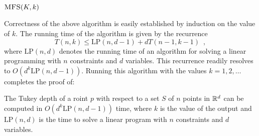 \documentclass[charterfonts,lotsofwhite]{patmorin}
\newcommand{\lp}{\mathrm{LP}}
\begin{document}
\noindent$\textsc{MFS}(K,k)$
\begin{algorithmic}[1]
\ENDIF
{}
\ENDIF
{}
   \ENDIF
\ENDFOR
{}
\end{algorithmic}

Correctness of the above algorithm is easily established by induction
on the value of $k$.  The running time of the algorithm is given by
the recurrence
\[
    T(n,k) \le \lp(n,d-1)+ dT(n-1,k-1) \enspace ,
\]
where $\lp(n,d)$ denotes the running time of an algorithm for solving
a linear programming with $n$ constraints and $d$ variables.  This
recurrence readily resolves to $O(d^k\lp(n,d-1))$.  Running this
algorithm with the values $k=1,2,\ldots$ completes the
proof of:

\begin{thm}
The Tukey depth of a roint $p$ with respect to a set $S$ of $n$ points
in $\mathbb{R}^d$ can be computed in $O(d^k\lp(n,d-1))$ time, where $k$ is
the value of the output and $\lp(n,d)$ is the time to solve a linear
program with $n$ constraints and $d$ variables.
\end{thm}
\end{document}
